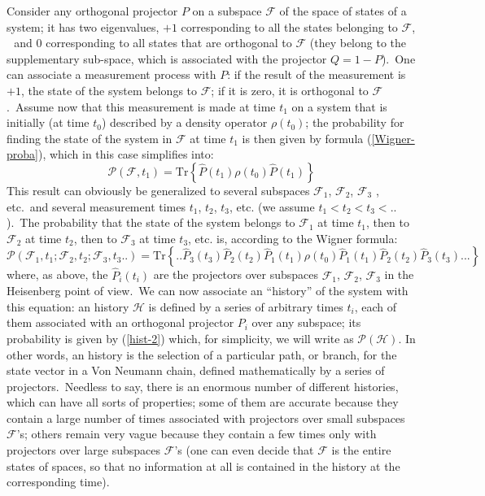\documentclass[12pt,onecolumn]{article}%
\begin{document}
Consider any orthogonal projector $P$ on a subspace $\mathcal{F}$ of the space
of states of a system; it has two eigenvalues, $+1$ corresponding to all the
states belonging to $\mathcal{F}$,$\mathcal{\,}$\ and $0$ corresponding to all
states that are orthogonal to $\mathcal{F}$ (they belong to the supplementary
sub-space, which is associated with the projector $Q=1-P$).\ One can associate
a measurement process with $P$: if the result of the measurement is $+1$, the
state of the system belongs to $\mathcal{F}$; if it is zero, it is orthogonal
to $\mathcal{F}$.\ Assume now that this measurement is made at time $t_{1}$ on
a system that is initially (at time $t_{0}$) described by a density operator
$\rho(t_{0})$; the probability for finding the state of the system in
$\mathcal{F}$ at time $t_{1}$ is then given by formula (\ref{Wigner-proba}),
which in this case simplifies into:%
\begin{equation}
\mathcal{P}(\mathcal{F},t_{1})=\text{Tr}\left\{  \widehat{P}(t_{1})\rho
(t_{0})\widehat{P}(t_{1})\right\}  \label{hist-1}%
\end{equation}
This result can obviously be generalized to several subspaces $\mathcal{F}%
_{1}$, $\mathcal{F}_{2}$, $\mathcal{F}_{3}$ , etc.\ and several measurement
times $t_{1}$, $t_{2}$, $t_{3}$, etc. (we assume $t_{1}<t_{2}<t_{3}<..$).\ The
probability that the state of the system belongs to $\mathcal{F}_{1}$ at time
$t_{1}$, then to $\mathcal{F}_{2}$ at time $t_{2}$, then to $\mathcal{F}_{3}$
at time $t_{3}$, etc. is, according to the Wigner formula:%
\begin{equation}
\mathcal{P}(\mathcal{F}_{1},t_{1};\mathcal{F}_{2},t_{2};\mathcal{F}_{3}%
,t_{3}..)=\text{Tr}\left\{  ..\widehat{P}_{3}(t_{3})\widehat{P}_{2}%
(t_{2})\widehat{P}_{1}(t_{1})\rho(t_{0})\widehat{P}_{1}(t_{1})\widehat{P}%
_{2}(t_{2})\widehat{P}_{3}(t_{3})...\right\}  \label{hist-2}%
\end{equation}
where, as above, the $\widehat{P}_{i}(t_{i})$ are the projectors over
subspaces $\mathcal{F}_{1}$, $\mathcal{F}_{2}$, $\mathcal{F}_{3}$ in the
Heisenberg point of view.\ We can now associate an ``history'' of the system
with this equation: an history $\mathcal{H}$ is defined by a series of
arbitrary times $t_{i}$, each of them associated with an orthogonal projector
$P_{i}$ over any subspace; its probability is given by (\ref{hist-2}) which,
for simplicity, we will write as $\mathcal{P}(\mathcal{H})$. In other words,
an history is the selection of a particular path, or branch, for the state
vector in a Von Neumann chain, defined mathematically by a series of
projectors.\ Needless to say, there is an enormous number of different
histories, which can have all sorts of properties; some of them are accurate
because they contain a large number of times associated with projectors over
small subspaces $\mathcal{F}$'s; others remain very vague because they contain
a few times only with projectors over large subspaces $\mathcal{F}$'s (one can
even decide that $\mathcal{F}$ is the entire states of spaces, so that no
information at all is contained in the history at the corresponding time).
\end{document}
